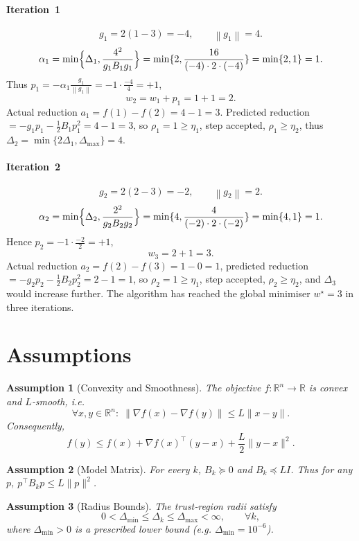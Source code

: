 \documentclass{article}
\newtheorem{assumption}{Assumption}
\newcommand{\norm}[1]{\left\lVert#1\right\rVert}
\newcommand{\R}{\mathbb{R}}
\begin{document}
\paragraph{Iteration~1}
\[
g_1=2(1-3)=-4,\qquad \norm{g_1}=4.
\]
\[
\alpha_1=\min\Bigl\{ \Delta_1,\frac{4^2}{g_1B_1g_1}\Bigr\}
        =\min\{2,\frac{16}{(-4)\cdot2\cdot(-4)}\}
        =\min\{2,1\}=1 .
\]
Thus $p_1=-\alpha_1\frac{g_1}{\norm{g_1}}= -1\cdot\frac{-4}{4}=+1$,
\[
w_2 = w_1 + p_1 = 1+1 = 2 .
\]
Actual reduction $a_1 = f(1)-f(2)=4-1=3$.
Predicted reduction $= -g_1p_1-\tfrac12 B_1 p_1^2 = 4-1=3$,
so $\rho_1=1\ge\eta_1$, step accepted, $\rho_1\ge\eta_2$, thus $\Delta_2=\min\{2\Delta_1,\Delta_{\max}\}=4$.

\paragraph{Iteration~2}
\[
g_2=2(2-3)=-2,\qquad \norm{g_2}=2.
\]
\[
\alpha_2=\min\Bigl\{ \Delta_2,\frac{2^2}{g_2B_2g_2}\Bigr\}
        =\min\{4,\frac{4}{(-2)\cdot2\cdot(-2)}\}
        =\min\{4,1\}=1 .
\]
Hence $p_2=-1\cdot\frac{-2}{2}=+1$, 
\[
w_3 = 2+1 = 3 .
\]
Actual reduction $a_2 = f(2)-f(3)=1-0=1$,
predicted reduction $= -g_2p_2-\tfrac12 B_2p_2^2 = 2-1=1$,
so $\rho_2=1\ge\eta_1$, step accepted, $\rho_2\ge\eta_2$, and $\Delta_3$ would increase further.  
The algorithm has reached the global minimiser $w^\star=3$ in three iterations.

\section*{Assumptions}
\begin{assumption}[Convexity and Smoothness]\label{ass:convex}
The objective $f:\R^{n}\to\R$ is convex and $L$‑smooth, i.e.
\[
\forall x,y\in\R^{n}:\;
\|\nabla f(x)-\nabla f(y)\|\le L\|x-y\| .
\]
Consequently,
\[
f(y)\le f(x)+\nabla f(x)^{\top}(y-x)+\frac{L}{2}\|y-x\|^{2}.
\tag{6}
\]
\end{assumption}

\begin{assumption}[Model Matrix]\label{ass:B}
For every $k$, $B_k\succeq 0$ and $B_k\preceq L I$.
Thus for any $p$, $p^{\top}B_k p\le L\|p\|^{2}$.
\end{assumption}

\begin{assumption}[Radius Bounds]\label{ass:radius}
The trust‑region radii satisfy
\[
0<\Delta_{\min}\le\Delta_k\le\Delta_{\max}<\infty,
\qquad\forall k,
\]
where $\Delta_{\min}>0$ is a prescribed lower bound (e.g. $\Delta_{\min}=10^{-6}$).
\end{assumption}
\end{document}
